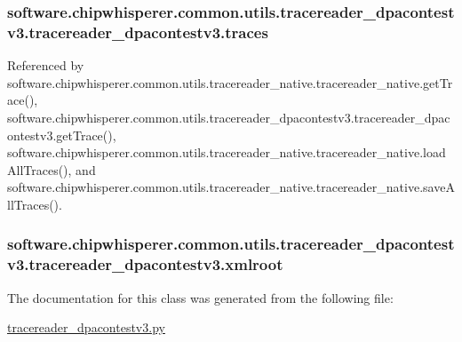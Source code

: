 \subsubsection[{traces}]{\setlength{\rightskip}{0pt plus 5cm}software.\+chipwhisperer.\+common.\+utils.\+tracereader\+\_\+dpacontestv3.\+tracereader\+\_\+dpacontestv3.\+traces}\label{classsoftware_1_1chipwhisperer_1_1common_1_1utils_1_1tracereader__dpacontestv3_1_1tracereader__dpacontestv3_a2e0902fde663a330f61c4240aa4d4975}


Referenced by software.\+chipwhisperer.\+common.\+utils.\+tracereader\+\_\+native.\+tracereader\+\_\+native.\+get\+Trace(), software.\+chipwhisperer.\+common.\+utils.\+tracereader\+\_\+dpacontestv3.\+tracereader\+\_\+dpacontestv3.\+get\+Trace(), software.\+chipwhisperer.\+common.\+utils.\+tracereader\+\_\+native.\+tracereader\+\_\+native.\+load\+All\+Traces(), and software.\+chipwhisperer.\+common.\+utils.\+tracereader\+\_\+native.\+tracereader\+\_\+native.\+save\+All\+Traces().

\hypertarget{classsoftware_1_1chipwhisperer_1_1common_1_1utils_1_1tracereader__dpacontestv3_1_1tracereader__dpacontestv3_aba4f6e8766c0dba01244a3db0baf4997}{}
\subsubsection[{xmlroot}]{\setlength{\rightskip}{0pt plus 5cm}software.\+chipwhisperer.\+common.\+utils.\+tracereader\+\_\+dpacontestv3.\+tracereader\+\_\+dpacontestv3.\+xmlroot}\label{classsoftware_1_1chipwhisperer_1_1common_1_1utils_1_1tracereader__dpacontestv3_1_1tracereader__dpacontestv3_aba4f6e8766c0dba01244a3db0baf4997}


The documentation for this class was generated from the following file\+:\begin{DoxyCompactItemize}
\item 
\hyperlink{tracereader__dpacontestv3_8py}{tracereader\+\_\+dpacontestv3.\+py}\end{DoxyCompactItemize}

